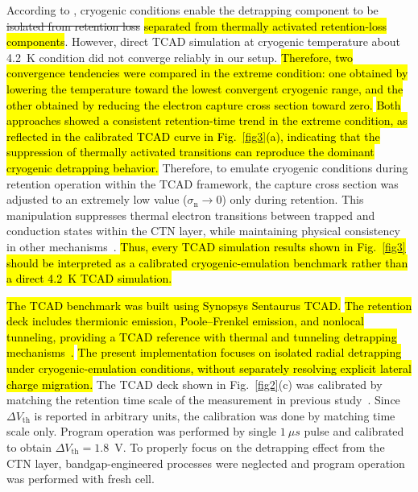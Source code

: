 \documentclass[journal,twoside,web]{ieeecolor}
\begin{document}
According to \cite{Refaldi.IRPS2025}, cryogenic conditions enable the detrapping component to be \sout{isolated from retention loss} \hl{separated from thermally activated retention-loss components}.
However, direct TCAD simulation at cryogenic temperature about 4.2~K condition did not converge reliably in our setup.
\hl{Therefore, two convergence tendencies were compared in the extreme condition: one obtained by lowering the temperature toward the lowest convergent cryogenic range, and the other obtained by reducing the electron capture cross section toward zero.}
\hl{Both approaches showed a consistent retention-time trend in the extreme condition, as reflected in the calibrated TCAD curve in \hbox{Fig.~\ref{fig3}(a)}, indicating that the suppression of thermally activated transitions can reproduce the dominant cryogenic detrapping behavior.}
Therefore, to emulate cryogenic conditions during retention operation within the TCAD framework, the capture cross section was adjusted to an extremely low value ($\sigma_\mathrm{n} \rightarrow 0$) only during retention.
This manipulation suppresses thermal electron transitions between trapped and conduction states within the CTN layer, while maintaining physical consistency in other mechanisms~\cite{TCADmanual.2022}.
\hl{Thus, every TCAD simulation results shown in \hbox{Fig.~\ref{fig3}} should be interpreted as a calibrated cryogenic-emulation benchmark rather than a direct 4.2~K TCAD simulation.}

\hl{The TCAD benchmark was built using Synopsys Sentaurus TCAD.}
\hl{The retention deck includes thermionic emission, Poole--Frenkel emission, and nonlocal tunneling, providing a TCAD reference with thermal and tunneling detrapping mechanisms~\hbox{\cite{TCADmanual.2022}}.}
\hl{The present implementation focuses on isolated radial detrapping under cryogenic-emulation conditions, without separately resolving explicit lateral charge migration.}
The TCAD deck shown in Fig.~\ref{fig2}(c) was calibrated by matching the retention time scale of the measurement in previous study~\cite{Refaldi.IRPS2025}.
Since $\Delta V_\text{th}$ is reported in arbitrary units, the calibration was done by matching time scale only.
Program operation was performed by single $1~\mu s$ pulse and calibrated to obtain $\Delta V_\text{th} = 1.8$~V.
To properly focus on the detrapping effect from the CTN layer, bandgap-engineered processes were neglected and program operation was performed with fresh cell.
\end{document}
